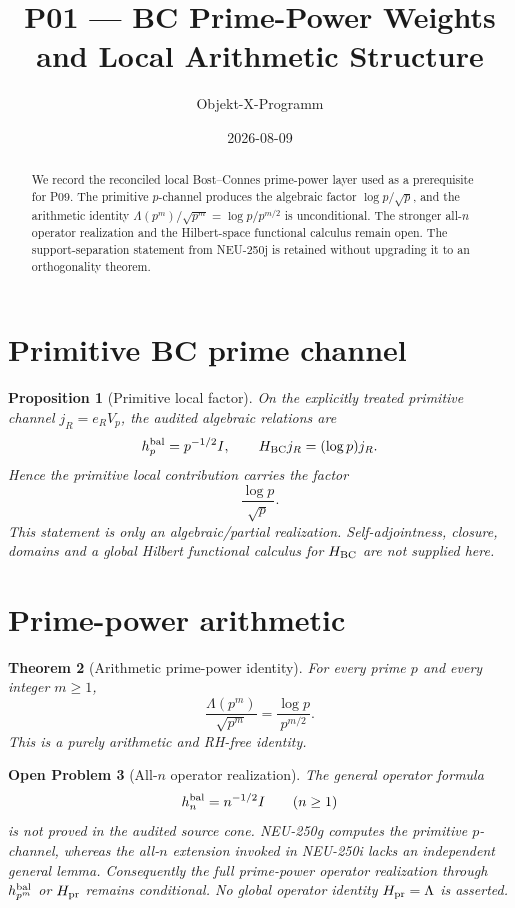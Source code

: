 \documentclass[11pt,a4paper]{amsart}
\title{P01 --- BC Prime-Power Weights and Local Arithmetic Structure}
\author{Objekt-X-Programm}
\date{2026-08-09}
\newtheorem{theorem}{Theorem}[section]
\newtheorem{proposition}[theorem]{Proposition}
\newtheorem{openproblem}[theorem]{Open Problem}
\begin{document}
\maketitle

\begin{abstract}
We record the reconciled local Bost--Connes prime-power layer used as a
prerequisite for P09.  The primitive $p$-channel produces the algebraic factor
$\log p/\sqrt p$, and the arithmetic identity
$\Lambda(p^m)/\sqrt{p^m}=\log p/p^{m/2}$ is unconditional.  The stronger
all-$n$ operator realization and the Hilbert-space functional calculus remain
open.  The support-separation statement from NEU-250j is retained without
upgrading it to an orthogonality theorem.
\end{abstract}

\section{Primitive BC prime channel}

\begin{proposition}[Primitive local factor]
On the explicitly treated primitive channel $j_R=e_RV_p$, the audited
algebraic relations are
\[
  h_p^{\rm bal}=p^{-1/2}I,
  \qquad
  H_{\rm BC}j_R=(\log p)j_R.
\]
Hence the primitive local contribution carries the factor
\[
  \boxed{\frac{\log p}{\sqrt p}}.
\]
This statement is only an algebraic/partial realization.  Self-adjointness,
closure, domains and a global Hilbert functional calculus for $H_{\rm BC}$
are not supplied here.
\end{proposition}

\section{Prime-power arithmetic}

\begin{theorem}[Arithmetic prime-power identity]
For every prime $p$ and every integer $m\ge1$,
\[
  \boxed{
  \frac{\Lambda(p^m)}{\sqrt{p^m}}
  =\frac{\log p}{p^{m/2}}.
  }
\]
This is a purely arithmetic and RH-free identity.
\end{theorem}

\begin{openproblem}[All-$n$ operator realization]
The general operator formula
\[
  h_n^{\rm bal}=n^{-1/2}I\qquad(n\ge1)
\]
is not proved in the audited source cone.  NEU-250g computes the primitive
$p$-channel, whereas the all-$n$ extension invoked in NEU-250i lacks an
independent general lemma.  Consequently the full prime-power operator
realization through $h_{p^m}^{\rm bal}$ or $H_{\rm pr}$ remains conditional.
No global operator identity $H_{\rm pr}=\Lambda$ is asserted.
\end{openproblem}
\end{document}
